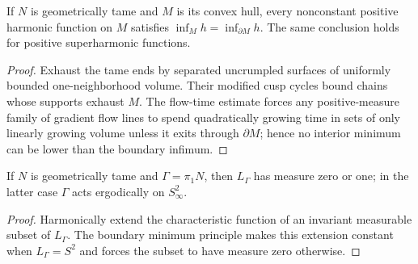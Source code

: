 \begin{theorem}
\label{thurston-ch08-tame-harmonic-minimum}
If $N$ is geometrically tame and $M$ is its convex hull, every nonconstant positive harmonic function on $M$ satisfies $\inf_Mh=\inf_{\partial M}h$.  The same conclusion holds for positive superharmonic functions.
\end{theorem}
\begin{proof}\sketch Exhaust the tame ends by separated uncrumpled surfaces of uniformly bounded one-neighborhood volume.  Their modified cusp cycles bound chains whose supports exhaust $M$.  The flow-time estimate forces any positive-measure family of gradient flow lines to spend quadratically growing time in sets of only linearly growing volume unless it exits through $\partial M$; hence no interior minimum can be lower than the boundary infimum.\end{proof}

\begin{corollary}
\label{thurston-ch08-tame-limit-ergodicity}
If $N$ is geometrically tame and $\Gamma=\pi_1N$, then $L_\Gamma$ has measure zero or one; in the latter case $\Gamma$ acts ergodically on $S^2_\infty$.
\end{corollary}
\begin{proof}\sketch Harmonically extend the characteristic function of an invariant measurable subset of $L_\Gamma$.  The boundary minimum principle makes this extension constant when $L_\Gamma=S^2$ and forces the subset to have measure zero otherwise.\end{proof}

